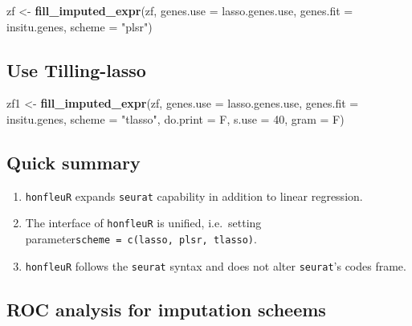 \documentclass[]{article}
\newenvironment{Shaded}{\begin{snugshade}}{\end{snugshade}}
\newcommand{\KeywordTok}[1]{\textcolor[rgb]{0.13,0.29,0.53}{\textbf{{#1}}}}
\newcommand{\DataTypeTok}[1]{\textcolor[rgb]{0.13,0.29,0.53}{{#1}}}
\newcommand{\DecValTok}[1]{\textcolor[rgb]{0.00,0.00,0.81}{{#1}}}
\newcommand{\StringTok}[1]{\textcolor[rgb]{0.31,0.60,0.02}{{#1}}}
\newcommand{\NormalTok}[1]{{#1}}
\providecommand{\tightlist}{%
  \setlength{\itemsep}{0pt}\setlength{\parskip}{0pt}}
\begin{document}
\begin{Shaded}
\begin{Highlighting}[]
\NormalTok{zf <-}\StringTok{ }\KeywordTok{fill_imputed_expr}\NormalTok{(zf, }\DataTypeTok{genes.use =} \NormalTok{lasso.genes.use, }\DataTypeTok{genes.fit =} \NormalTok{insitu.genes,}
                        \DataTypeTok{scheme =} \StringTok{"plsr"}\NormalTok{)}
\end{Highlighting}
\end{Shaded}

\subsection{Use Tilling-lasso}\label{use-tilling-lasso}

\begin{Shaded}
\begin{Highlighting}[]
\NormalTok{zf1 <-}\StringTok{ }\KeywordTok{fill_imputed_expr}\NormalTok{(zf, }\DataTypeTok{genes.use =} \NormalTok{lasso.genes.use, }\DataTypeTok{genes.fit =} \NormalTok{insitu.genes, }
                         \DataTypeTok{scheme =} \StringTok{"tlasso"}\NormalTok{,}
                         \DataTypeTok{do.print =} \NormalTok{F, }\DataTypeTok{s.use =} \DecValTok{40}\NormalTok{, }\DataTypeTok{gram =} \NormalTok{F)}
\end{Highlighting}
\end{Shaded}

\subsection{Quick summary}\label{quick-summary}

\begin{enumerate}
\def\labelenumi{\arabic{enumi}.}
\tightlist
\item
  \texttt{honfleuR} expands \texttt{seurat} capability in addition to
  linear regression.
\item
  The interface of \texttt{honfleuR} is unified, i.e.~setting
  parameter\texttt{scheme\ =\ c(\textquotesingle{}lasso\textquotesingle{},\ \textquotesingle{}plsr\textquotesingle{},\ \textquotesingle{}tlasso\textquotesingle{})}.
\item
  \texttt{honfleuR} follows the \texttt{seurat} syntax and does not
  alter \texttt{seurat}'s codes frame.
\end{enumerate}

\subsection{ROC analysis for imputation
scheems}\label{roc-analysis-for-imputation-scheems}
\end{document}
